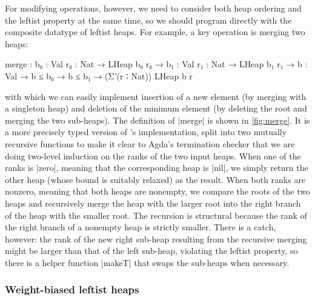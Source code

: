For modifying operations, however, we need to consider both heap ordering and the leftist property at the same time, so we should program directly with the composite datatype of leftist heaps.
For example, a key operation is merging two heaps:
\begin{code}
merge :  {b₀  : Val} {r₀  : Nat} → LHeap b₀  r₀  →
         {b₁  : Val} {r₁  : Nat} → LHeap b₁  r₁  →
         {b   : Val} → b ≤ b₀ → b ≤ b₁ → (Σ'(r ∶ Nat)) LHeap b r
\end{code}
with which we can easily implement insertion of a new element (by merging with a singleton heap) and deletion of the minimum element (by deleting the root and merging the two sub-heaps).
The definition of |merge| is shown in \autoref{fig:merge}.
It is a more precisely typed version of \citeauthor{Okasaki-data-structures}'s implementation, split into two mutually recursive functions to make it clear to Agda's termination checker that we are doing two-level induction on the ranks of the two input heaps.
When one of the ranks is |zero|, meaning that the corresponding heap is |nil|, we simply return the other heap (whose bound is suitably relaxed) as the result.
When both ranks are nonzero, meaning that both heaps are nonempty, we compare the roots of the two heaps and recursively merge the heap with the larger root into the right branch of the heap with the smaller root.
The recursion is structural because the rank of the right branch of a nonempty heap is strictly smaller.
There is a catch, however: the rank of the new right sub-heap resulting from the recursive merging might be larger than that of the left sub-heap, violating the leftist property, so there is a helper function |makeT| that swaps the sub-heaps when necessary.

\subsubsection{Weight-biased leftist heaps}

